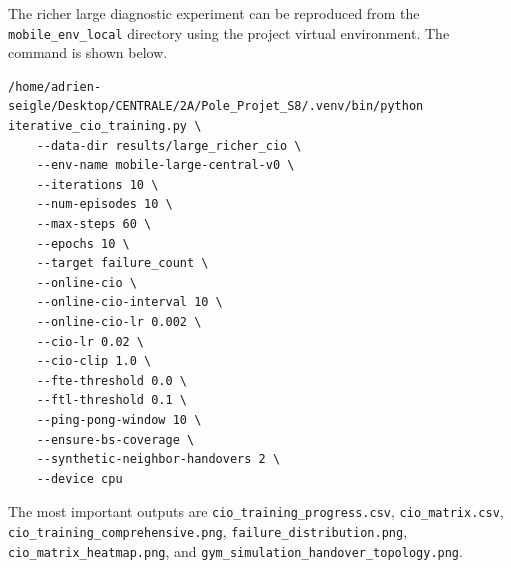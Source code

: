 \documentclass[11pt, a4paper, twoside]{article}
\begin{document}
The richer large diagnostic experiment can be reproduced from the \texttt{mobile\_env\_local} directory using the project virtual environment. The command is shown below.

\begin{lstlisting}[caption={Large richer CIO diagnostic experiment}]
/home/adrien-seigle/Desktop/CENTRALE/2A/Pole_Projet_S8/.venv/bin/python iterative_cio_training.py \
    --data-dir results/large_richer_cio \
    --env-name mobile-large-central-v0 \
    --iterations 10 \
    --num-episodes 10 \
    --max-steps 60 \
    --epochs 10 \
    --target failure_count \
    --online-cio \
    --online-cio-interval 10 \
    --online-cio-lr 0.002 \
    --cio-lr 0.02 \
    --cio-clip 1.0 \
    --fte-threshold 0.0 \
    --ftl-threshold 0.1 \
    --ping-pong-window 10 \
    --ensure-bs-coverage \
    --synthetic-neighbor-handovers 2 \
    --device cpu
\end{lstlisting}

The most important outputs are \texttt{cio\_training\_progress.csv}, \texttt{cio\_matrix.csv}, \texttt{cio\_training\_comprehensive.png}, \texttt{failure\_distribution.png}, \texttt{cio\_matrix\_heatmap.png}, and \texttt{gym\_simulation\_handover\_topology.png}.
\end{document}
